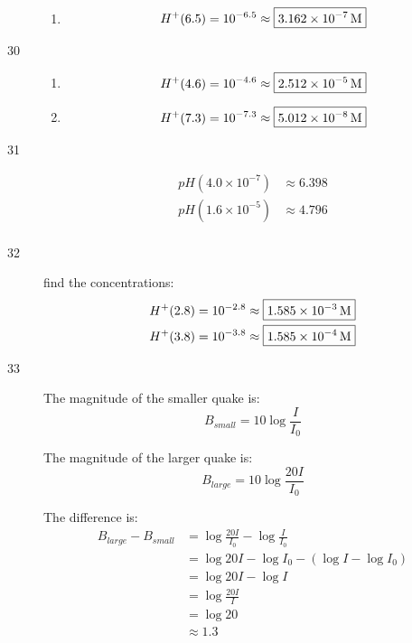 \documentclass{exam}
\begin{document}
\begin{description}
\begin{enumerate}[a]
          \item 
            \[
              H^+(6.5) = 10^{-6.5} \approx \boxed{\unit[3.162 \times 10^{-7}]{M}} \\
            \]

        \end{enumerate}

      \item[30]
        \begin{enumerate}[a]
          \item 
            \[
              H^+(4.6) = 10^{-4.6} \approx \boxed{\unit[2.512 \times 10^{-5}]{M}} \\
            \]

          \item 
            \[
              H^+(7.3) = 10^{-7.3} \approx \boxed{\unit[5.012 \times 10^{-8}]{M}} \\
            \]

        \end{enumerate}

      \item[31]
        \begin{align*}
          pH(4.0 \times 10^{-7}) & \approx \boxed{6.398} \\
          pH(1.6 \times 10^{-5}) & \approx \boxed{4.796} \\
        \end{align*}

      \item[32]
        find the concentrations:
        \begin{align*}
          H^+(2.8) &= 10^{-2.8} \approx \boxed{\unit[1.585 \times 10^{-3}]{M}} \\
          H^+(3.8) &= 10^{-3.8} \approx \boxed{\unit[1.585 \times 10^{-4}]{M}} \\
        \end{align*}

      \item[33]
        The magnitude of the smaller quake is:
        \[
          B_{small} = 10 \log \frac{I}{I_0}
        \]

        The magnitude of the larger quake is:
        \[
          B_{large} = 10 \log \frac{20 I}{I_0}
        \]

        The difference is:
        \begin{align*}
          B_{large} - B_{small} & = \log \frac{20 I}{I_0} - \log \frac{I}{I_0} \\
                                & = \log 20I - \log I_0 - ( \log I - \log I_0) \\
                                & = \log 20I - \log I \\
                                & = \log \frac{20I}{I} \\
                                & = \log 20 \\
                                & \approx \boxed{1.3} \\
        \end{align*}


\end{description}
\end{document}
